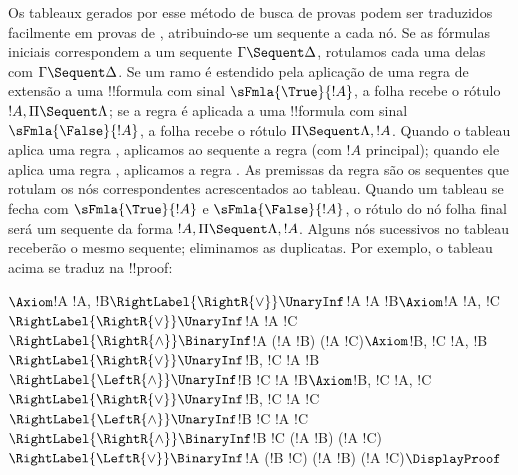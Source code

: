 \documentclass[../../../include/open-logic-section]{subfiles}
\begin{document}
Os tableaux gerados por esse método de busca de provas podem ser
traduzidos facilmente em provas de , atribuindo-se um sequente
a cada nó. Se as fórmulas iniciais correspondem a um sequente $\Gamma
\Sequent \Delta$, rotulamos cada uma delas com $\Gamma \Sequent
\Delta$. Se um ramo é estendido pela aplicação de uma regra de extensão
a uma !!{formula} com sinal $\sFmla{\True}{!A}$, a folha recebe o rótulo
$!A, \Pi \Sequent \Lambda$; se a regra é aplicada a uma !!{formula} com
sinal $\sFmla{\False}{!A}$, a folha recebe o rótulo $\Pi \Sequent
\Lambda, !A$. Quando o tableau aplica uma regra
\TRule{\True}{\star}, aplicamos ao sequente a regra \LeftR{\star} (com
$!A$ principal); quando ele aplica uma regra \TRule{\False}{\star},
aplicamos a regra \RightR{\star}. As premissas da regra são os sequentes
que rotulam os nós correspondentes acrescentados ao tableau. Quando um
tableau se fecha com $\sFmla{\True}{!A}$ e $\sFmla{\False}{!A}$, o
rótulo do nó folha final será um sequente da forma $!A, \Pi \Sequent
\Lambda, !A$. Alguns nós sucessivos no tableau receberão o mesmo
sequente; eliminamos as duplicatas. Por exemplo, o tableau acima se
traduz na !!{proof}:

\begin{maxwidth}
$
\Axiom$!A \fCenter !A, !B$
\RightLabel{\RightR{\lor}}
\UnaryInf$!A \fCenter !A \lor !B$
\Axiom$!A \fCenter !A, !C$
\RightLabel{\RightR{\lor}}
\UnaryInf$!A \fCenter !A \lor !C$
\RightLabel{\RightR{\land}}
\BinaryInf$!A \fCenter (!A \lor !B) \land (!A \lor !C)$
\Axiom$!B, !C \fCenter !A, !B$
\RightLabel{\RightR{\lor}}
\UnaryInf$!B, !C \fCenter !A \lor !B$
\RightLabel{\LeftR{\land}}
\UnaryInf$!B \land !C \fCenter !A \lor !B$
\Axiom$!B, !C \fCenter !A, !C$
\RightLabel{\RightR{\lor}}
\UnaryInf$!B, !C \fCenter !A \lor !C$
\RightLabel{\LeftR{\land}}
\UnaryInf$!B \land !C \fCenter !A \lor !C$
\RightLabel{\RightR{\land}}
\BinaryInf$!B \land !C \fCenter (!A \lor !B) \land
(!A \lor !C)$
\RightLabel{\LeftR{\lor}}
\BinaryInf$!A \lor (!B \land !C) \fCenter (!A \lor !B) \land
(!A \lor !C)$
\DisplayProof$
\end{maxwidth}
\end{document}
